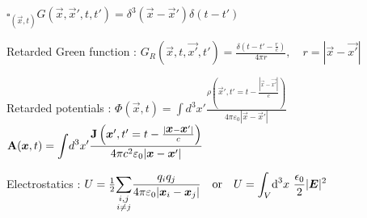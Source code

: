 \squishend




\squishlist

\item $\square_{\left(\vec{x},t\right)} G(\vec{x},\vec{x}',t,t') = \delta^3(\vec{x}-\vec{x}')\delta(t-t')$

\item Retarded Green function : $G_R(\vec{x},t,\vec{x'},t')=\frac{\delta(t-t'-\frac{r}{c})}{4\pi r}, \quad{r=|\vec{x}-\vec{x'}|} $

\item Retarded potentials : $\Phi (\vec{x},t) = \displaystyle{\int} d^3x' \frac{\rho\left(\vec{x}',t'=t-\frac{|\vec{x}-\vec{x'}|}{c}\right)}{4\pi \varepsilon_0 |\vec{x}-\vec{x}'|}$
\\
$\vec{\rm{A}}(\vec{x},t) = \displaystyle{\int} d^3 x' \frac{\vec{\rm{J}}\left(\vec{x}',t'=t-\frac{|\vec{x}-\vec{x}'|}{c}\right)}{4\pi c^2 \varepsilon_0 |\vec{x}-\vec{x}'|}$
\squishend
{}
\squishlist
\item Electrostatics : $U = \frac{1}{2} \displaystyle{ \sum_{\substack{i,j\\i\neq j}}} \frac{q_iq_j}{4\pi\varepsilon_0|\vec{x}_i-\vec{x}_j|} \quad  \text{or} \quad U = \displaystyle{\int_{V}} \ud ^3x \,\, \frac{\epsilon_0}{2} |\vec{E}|^2$

